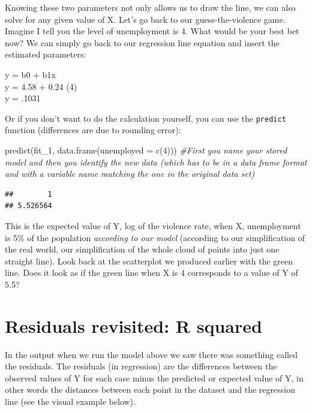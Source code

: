 \documentclass[
]{book}
\newenvironment{Shaded}{\begin{snugshade}}{\end{snugshade}}
\newcommand{\AttributeTok}[1]{\textcolor[rgb]{0.77,0.63,0.00}{#1}}
\newcommand{\CommentTok}[1]{\textcolor[rgb]{0.56,0.35,0.01}{\textit{#1}}}
\newcommand{\DecValTok}[1]{\textcolor[rgb]{0.00,0.00,0.81}{#1}}
\newcommand{\FunctionTok}[1]{\textcolor[rgb]{0.00,0.00,0.00}{#1}}
\newcommand{\NormalTok}[1]{#1}
\begin{document}
Knowing these two parameters not only allows us to draw the line, we can also solve for any given value of X. Let's go back to our guess-the-violence game. Imagine I tell you the level of unemployment is 4. What would be your best bet now? We can simply go back to our regression line equation and insert the estimated parameters:

y = b0 + b1x\\
y = 4.58 + 0.24 (4)\\
y = .1031

Or if you don't want to do the calculation yourself, you can use the \texttt{predict} function (differences are due to rounding error):

\begin{Shaded}
\begin{Highlighting}[]
\FunctionTok{predict}\NormalTok{(fit\_1, }\FunctionTok{data.frame}\NormalTok{(}\AttributeTok{unemployed =} \FunctionTok{c}\NormalTok{(}\DecValTok{4}\NormalTok{))) }\CommentTok{\#First you name your stored model and then you identify the new data (which has to be in a data frame format and with a variable name matching the one in the original data set)}
\end{Highlighting}
\end{Shaded}

\begin{verbatim}
##        1 
## 5.526564
\end{verbatim}

This is the expected value of Y, log of the violence rate, when X, unemployment is 5\% of the population \emph{according to our model} (according to our simplification of the real world, our simplification of the whole cloud of points into just one straight line). Look back at the scatterplot we produced earlier with the green line. Does it look as if the green line when X is 4 corresponds to a value of Y of 5.5?

\hypertarget{residuals-revisited-r-squared}{%
\section{Residuals revisited: R squared}\label{residuals-revisited-r-squared}}

In the output when we run the model above we saw there was something called the residuals. The residuals (in regression) are the differences between the observed values of Y for each case minus the predicted or expected value of Y, in other words the distances between each point in the dataset and the regression line (see the visual example below).
\end{document}
